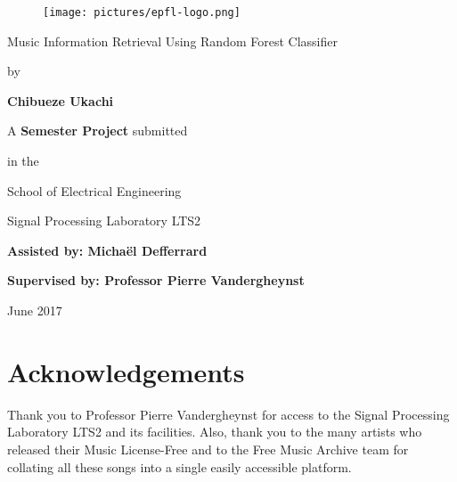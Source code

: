 \documentclass[11pt]{article}
\newcommand{\mytitle}{Music Information Retrieval Using Random Forest Classifier \break }
\newcommand{\bywhom}{by}
\newcommand{\authorname}{Chibueze Ukachi \break}
\newcommand{\semproj}{A \textbf{Semester Project} submitted}
\newcommand{\where}{in the}
\newcommand{\school}{School of Electrical Engineering}
\newcommand{\labinfo}{Signal Processing Laboratory LTS2 \break}
\newcommand{\labowner}{Supervised by: 
Professor Pierre Vandergheynst \break}
\newcommand{\assistance}{Assisted by: Micha\"el Defferrard}
\newcommand{\monthandyear}{June 2017}
\begin{document}
\thispagestyle{empty}


\begin{figure}[h!]
\centering
\texttt{[image: pictures/epfl-logo.png]}
\end{figure}


\begin{center}
\huge{\mytitle}
\end{center}

\begin{center}
\bywhom
\end{center}

\begin{center}
\textbf{\Large{\authorname}}

\end{center}

\begin{center}
\semproj
\end{center}

\begin{center}
 \where
\end{center}

\begin{center}
\school
\end{center}

\begin{center}
\labinfo
\end{center}

\begin{center}
\textbf{\assistance}
\end{center}

\begin{center}
\textbf{\labowner}
\end{center}

\begin{center}
\monthandyear
\end{center}


\newpage
\clearpage


\setcounter{page}{1}
\section*{Acknowledgements}


Thank you to Professor Pierre Vandergheynst for access to the Signal Processing Laboratory LTS2 and its facilities. Also, thank you to the many artists who released their Music License-Free and to the Free Music Archive team for collating all these songs into a single easily accessible platform. 
\newline
\end{document}
